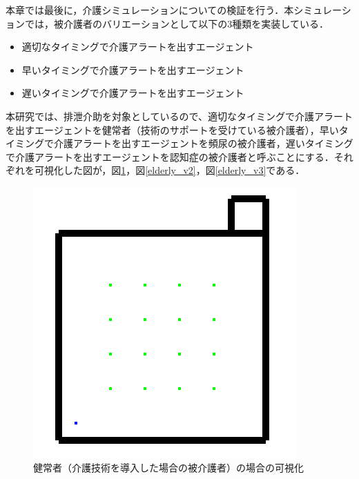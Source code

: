 本章では最後に，介護シミュレーションについての検証を行う．本シミュレーションでは，被介護者のバリエーションとして以下の3種類を実装している．

\begin{itemize}
 \item 適切なタイミングで介護アラートを出すエージェント
 \item 早いタイミングで介護アラートを出すエージェント
 \item 遅いタイミングで介護アラートを出すエージェント
\end{itemize}

本研究では、排泄介助を対象としているので、適切なタイミングで介護アラートを出すエージェントを健常者（技術のサポートを受けている被介護者），早いタイミングで介護アラートを出すエージェントを頻尿の被介護者，遅いタイミングで介護アラートを出すエージェントを認知症の被介護者と呼ぶことにする．それぞれを可視化した図が，図\ref{elderly_v1}，図\ref{elderly_v2}，図\ref{elderly_v3}である．

\begin{figure}[htb]
\begin{center}
 \includegraphics[scale=0.5]{figures/elderly_v1.png}
 \caption[健常者（介護技術を導入した場合の被介護者）の場合の可視化]{健常者（介護技術を導入した場合の被介護者）の場合の可視化 \label{elderly_v1}}
\end{center}
\end{figure}

